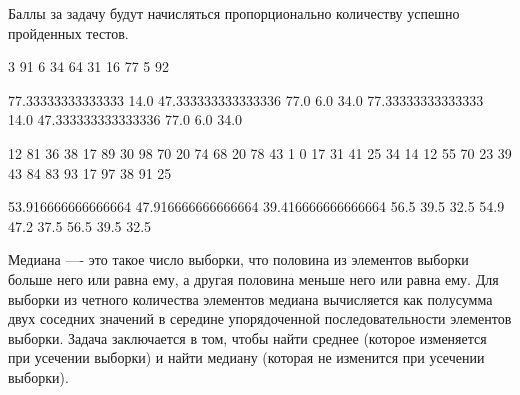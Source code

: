 Баллы за задачу будут начисляться пропорционально количеству успешно пройденных тестов.


\begin{myverbbox}[\small]{\vinput}
    3
    91 6 34
    64 31 16
    77 5 92
\end{myverbbox}

\begin{myverbbox}[\small]{\voutput}
    77.33333333333333 14.0 47.333333333333336
    77.0 6.0 34.0
    77.33333333333333 14.0 47.333333333333336
    77.0 6.0 34.0
\end{myverbbox}


\begin{myverbbox}[\small]{\vinput}
    12
    81 36 38
    17 89 30
    98 70 20
    74 68 20
    78 43 1
    0 17 31
    41 25 34
    14 12 55
    70 23 39
    43 84 83
    93 17 97
    38 91 25
\end{myverbbox}

\begin{myverbbox}[\small]{\voutput}
    53.916666666666664 47.916666666666664 39.416666666666664
    56.5 39.5 32.5
    54.9 47.2 37.5
    56.5 39.5 32.5
\end{myverbbox}




\solutionSection
Медиана —- это такое число выборки, что половина из элементов выборки больше него или равна ему, а другая половина меньше него или равна ему. Для выборки из четного количества элементов медиана вычисляется как полусумма двух соседних значений в середине упорядоченной последовательности элементов выборки. Задача заключается в том, чтобы найти среднее (которое изменяется при усечении выборки) и найти медиану (которая не изменится при усечении выборки).

